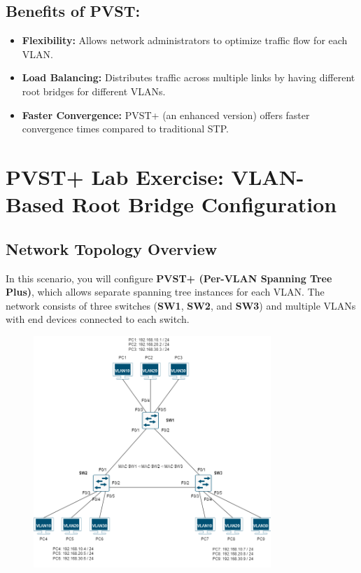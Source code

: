 \documentclass[a4paper]{book}
\begin{document}
\section*{Benefits of PVST:}
\begin{itemize}
    \item \textbf{Flexibility:} Allows network administrators to optimize traffic flow for each VLAN.
    \item \textbf{Load Balancing:} Distributes traffic across multiple links by having different root bridges for different VLANs.
    \item \textbf{Faster Convergence:} PVST+ (an enhanced version) offers faster convergence times compared to traditional STP.

\end{itemize}

\newpage

\chapter{PVST+ Lab Exercise: VLAN-Based Root Bridge Configuration}

\section*{Network Topology Overview}
In this scenario, you will configure \textbf{PVST+ (Per-VLAN Spanning Tree Plus)}, which allows separate spanning tree instances for each VLAN. The network consists of three switches (\textbf{SW1}, \textbf{SW2}, and \textbf{SW3}) and multiple VLANs with end devices connected to each switch.


\begin{figure}[h]
    \centering
    \includegraphics[width=0.8\textwidth]{img/pvst01.png}
    \caption{\textit{}}
\end{figure}
\end{document}
